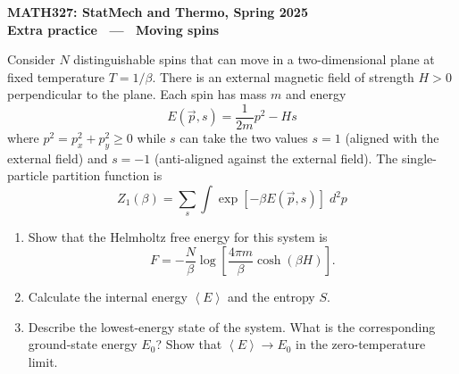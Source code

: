 \documentclass[12 pt]{article} %
\newcommand{\be}{\ensuremath{\beta} }
\newcommand{\vev}[1]{\ensuremath{\left\langle #1 \right\rangle} }
\begin{document}
\newcommand{\thisunit}{MATH327 Extra (Moving spins)}
\newcommand{\moddate}{Last modified 12 May 2025}
\begin{center}
  {\Large \textbf{MATH327: StatMech and Thermo, Spring 2025}} \\[12 pt]
  {\Large \textbf{Extra practice \ --- \ Moving spins}} \\[24 pt]
\end{center}

Consider $N$ distinguishable spins that can move in a two-dimensional plane at fixed temperature $T = 1 / \be$.
There is an external magnetic field of strength $H > 0$ perpendicular to the plane.
Each spin has mass $m$ and energy
\begin{equation*}
  E(\vec p, s) = \frac{1}{2m}p^2 - Hs
\end{equation*}
where $p^2 = p_x^2 + p_y^2 \geq 0$ while $s$ can take the two values $s = 1$ (aligned with the external field) and $s = -1$ (anti-aligned against the external field).
The single-particle partition function is
\begin{equation*}
  Z_1(\be) = \sum_s \int \exp\left[-\be E(\vec p, s)\right] \; d^2{p}
\end{equation*}

\begin{enumerate}[label={(\alph*)}]
  \item Show that the Helmholtz free energy for this system is
        \begin{equation*}
          F = -\frac{N}{\be} \log\left[\frac{4\pi m}{\be} \cosh(\be H)\right].
        \end{equation*}

  \item Calculate the internal energy $\vev{E}$ and the entropy $S$.

  \item Describe the lowest-energy state of the system.
        What is the corresponding ground-state energy $E_0$?
        Show that $\vev{E} \to E_0$ in the zero-temperature limit.
\end{enumerate}
\end{document}
